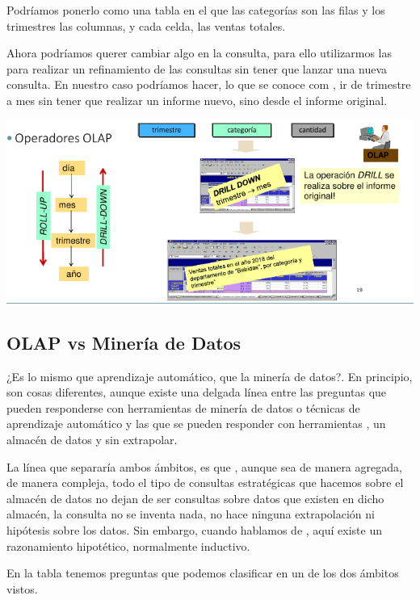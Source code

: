 Podríamos ponerlo como una tabla en el que las categorías son las filas y los trimestres las columnas, y cada celda, las ventas totales.

Ahora podríamos querer cambiar algo en la consulta, para ello utilizarmos las  para realizar un refinamiento de las consultas sin tener que lanzar una nueva consulta. En nuestro caso podríamos hacer, lo que se conoce com , ir de trimestre a mes sin tener que realizar un informe nuevo, sino desde el informe original.

\begin{center}
    \includegraphics[scale=.8]{images/mod01-12_1.png}
\end{center}

\subsection{OLAP vs Minería de Datos}

¿Es  lo mismo que aprendizaje automático, que la minería de datos?. En principio, son cosas diferentes, aunque existe una delgada línea entre las preguntas que pueden responderse con herramientas de minería de datos o técnicas de aprendizaje automático y las que se pueden responder con herramientas , un almacén de datos y sin extrapolar.

La línea que separaría ambos ámbitos, es que , aunque sea de manera agregada, de manera compleja, todo el tipo de consultas estratégicas que hacemos sobre el almacén de datos no dejan de ser consultas sobre datos que existen en dicho almacén, la consulta no se inventa nada, no hace ninguna extrapolación ni hipótesis sobre los datos. Sin embargo, cuando hablamos de , aquí existe un razonamiento hipotético, normalmente inductivo. 

En la tabla tenemos preguntas que podemos clasificar en un de los dos ámbitos vistos.

